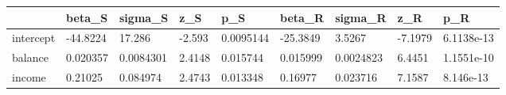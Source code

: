 \begin{tabular}{lllllllll}
& beta_S & sigma_S & z_S & p_S & beta_R & sigma_R & z_R & p_R \\ 
\hline 
intercept & -44.8224 & 17.286 & -2.593 & 0.0095144 & -25.3849 & 3.5267 & -7.1979 & 6.1138e-13 \\ 
balance & 0.020357 & 0.0084301 & 2.4148 & 0.015744 & 0.015999 & 0.0024823 & 6.4451 & 1.1551e-10 \\ 
income & 0.21025 & 0.084974 & 2.4743 & 0.013348 & 0.16977 & 0.023716 & 7.1587 & 8.146e-13 \\ 
\hline 
\end{tabular}